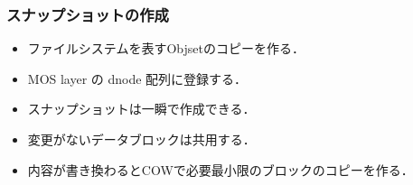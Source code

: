 \documentclass{beamer}                   %
\begin{document}
\begin{frame}[fragile]
  \frametitle{スナップショットの作成}
  \begin{itemize}
  \item ファイルシステムを表すObjsetのコピーを作る．
  \item MOS layer の dnode 配列に登録する．
  \item スナップショットは一瞬で作成できる．
  \item 変更がないデータブロックは共用する．
  \item 内容が書き換わるとCOWで必要最小限のブロックのコピーを作る．
  \end{itemize}
  \vfill
\end{frame}

\end{document}

